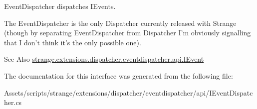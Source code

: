 Event\-Dispatcher dispatches I\-Events.

The Event\-Dispatcher is the only Dispatcher currently released with Strange (though by separating Event\-Dispatcher from Dispatcher I'm obviously signalling that I don't think it's the only possible one).

\begin{DoxySeeAlso}{See Also}
\hyperlink{interfacestrange_1_1extensions_1_1dispatcher_1_1eventdispatcher_1_1api_1_1_i_event}{strange.\-extensions.\-dispatcher.\-eventdispatcher.\-api.\-I\-Event} 
\end{DoxySeeAlso}


The documentation for this interface was generated from the following file\-:\begin{DoxyCompactItemize}
\item 
Assets/scripts/strange/extensions/dispatcher/eventdispatcher/api/I\-Event\-Dispatcher.\-cs\end{DoxyCompactItemize}
